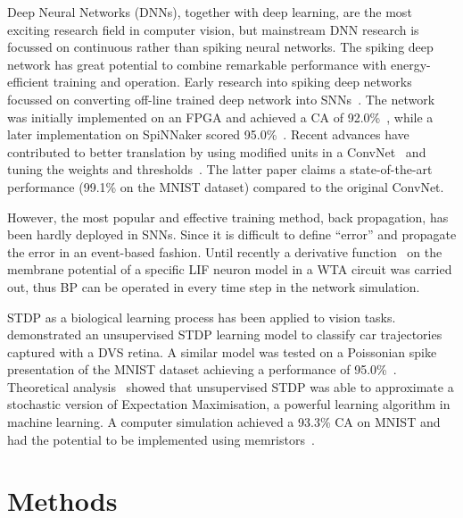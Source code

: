 Deep Neural Networks (DNNs), together with deep learning, are the most exciting research field in computer vision, but mainstream DNN research is focussed on continuous rather than spiking neural networks.
The spiking deep network has great potential to combine remarkable performance with energy-efficient training and operation.
Early research into spiking deep networks focussed on converting off-line trained deep network into SNNs~\cite{o2013real}.
The network was initially implemented on an FPGA and achieved a CA of 92.0\%~\cite{neil2014minitaur}, while a later implementation on SpiNNaker scored 95.0\%~\cite{Stromatias2015scalable}.
Recent advances have contributed to better translation by using modified units in a ConvNet~\cite{cao2015spiking} and tuning the weights and thresholds~\cite{Diehl2015fast}.
The latter paper claims a state-of-the-art performance (99.1\% on the MNIST dataset) compared to the original ConvNet.

However, the most popular and effective training method, back propagation, has been hardly deployed in SNNs.
Since it is difficult to define ``error'' and propagate the error in an event-based fashion.
Until recently a derivative function~\cite{lee2016training,park2016efficient} on the membrane potential of a specific LIF neuron model in a WTA circuit was carried out, thus BP can be operated in every time step in the network simulation.


STDP as a biological learning process has been applied to vision tasks.
\cite{bichler2012extraction} demonstrated an unsupervised STDP learning model to classify car trajectories captured with a DVS retina. 
A similar model was tested on a Poissonian spike presentation of the MNIST dataset achieving a performance of 95.0\%~\cite{diehl2015unsupervised}.
Theoretical analysis~\cite{nessler2013bayesian} showed that unsupervised STDP was able to approximate a stochastic version of Expectation Maximisation, a powerful learning algorithm in machine learning.
A computer simulation achieved a 93.3\% CA on MNIST and had the potential to be implemented using memristors~\cite{bill2014compound}. 
\section{Methods}
\label{sec:method}
